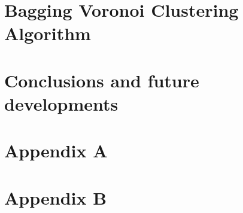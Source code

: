 \documentclass{Configuration_Files/PoliMi3i_thesis}
\begin{document}
\chapter{Bagging Voronoi Clustering Algorithm}
\label{ch:baggingvoronoi}



\chapter{Conclusions and future developments}
\label{ch:conclusions}%






\cleardoublepage
{} %
\appendix

\chapter{Appendix A}
\label{ap:research}


\chapter{Appendix B}
\label{ap:Python}%





\cleardoublepage
\end{document}

